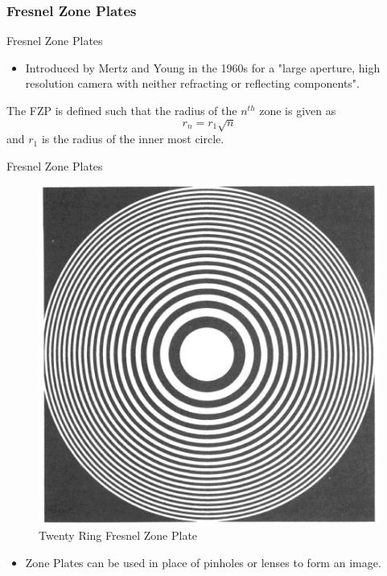 \documentclass{beamer}
\begin{document}
\subsubsection[]{Fresnel Zone Plates}
\begin{frame}{Fresnel Zone Plates}
\begin{itemize}
\item Introduced by Mertz and Young in the 1960s for a "large aperture, high resolution camera with neither refracting or reflecting components".
\end{itemize}
The FZP is defined such that the radius of the $n^{th}$ zone is given as 
$$
r_n = r_1 \sqrt{n}
$$
and $r_1$ is the radius of the inner most circle.
\end{frame}
\begin{frame}{Fresnel Zone Plates}
\begin{figure}
\includegraphics[scale=0.25]{doc_images/lensless_3.PNG}
\caption{Twenty Ring Fresnel Zone Plate}
\end{figure}
\begin{itemize}
\item Zone Plates can be used in place of pinholes or lenses to form an image.
\end{itemize}
\end{frame}
\end{document}
